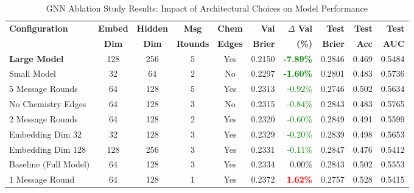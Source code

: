
\begin{table}[htbp]
\centering
\caption{GNN Ablation Study Results: Impact of Architectural Choices on Model Performance}
\label{tab:gnn_ablation}
\footnotesize
\begin{tabular}{@{}lccccrrrrr@{}}
\toprule
\textbf{Configuration} & \textbf{Embed} & \textbf{Hidden} & \textbf{Msg} & \textbf{Chem} & \textbf{Val} & \textbf{$\Delta$ Val} & \textbf{Test} & \textbf{Test} & \textbf{Test} \\
 & \textbf{Dim} & \textbf{Dim} & \textbf{Rounds} & \textbf{Edges} & \textbf{Brier} & \textbf{(\%)} & \textbf{Brier} & \textbf{Acc} & \textbf{AUC} \\
\midrule
\textbf{Large Model} & 128 & 256 & 5 & Yes & 0.2150 & \textcolor{green}{\textbf{-7.89\%}} & 0.2846 & 0.469 & 0.5484 \\
Small Model & 32 & 64 & 2 & No & 0.2297 & \textcolor{green}{\textbf{-1.60\%}} & 0.2801 & 0.483 & 0.5736 \\
5 Message Rounds & 64 & 128 & 5 & Yes & 0.2313 & \textcolor{green}{-0.92\%} & 0.2746 & 0.502 & 0.5634 \\
No Chemistry Edges & 64 & 128 & 3 & No & 0.2315 & \textcolor{green}{-0.84\%} & 0.2843 & 0.483 & 0.5765 \\
2 Message Rounds & 64 & 128 & 2 & Yes & 0.2320 & \textcolor{green}{-0.60\%} & 0.2849 & 0.491 & 0.5599 \\
Embedding Dim 32 & 32 & 128 & 3 & Yes & 0.2329 & \textcolor{green}{-0.20\%} & 0.2839 & 0.498 & 0.5653 \\
Embedding Dim 128 & 128 & 256 & 3 & Yes & 0.2331 & \textcolor{green}{-0.11\%} & 0.2847 & 0.476 & 0.5412 \\
Baseline (Full Model) & 64 & 128 & 3 & Yes & 0.2334 & 0.00\% & 0.2843 & 0.502 & 0.5553 \\
1 Message Round & 64 & 128 & 1 & Yes & 0.2372 & \textcolor{red}{\textbf{1.62\%}} & 0.2757 & 0.528 & 0.5415 \\
\bottomrule
\end{tabular}


\end{table}
